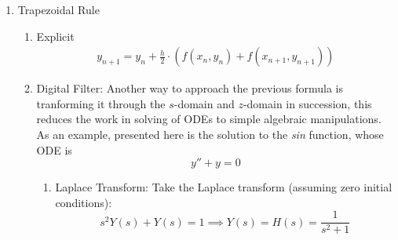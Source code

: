 \documentclass[conference]{IEEEtran}
\begin{document}
\begin{enumerate}
\begin{enumerate}
\item {Backward Euler (Implicit)}
\begin{align}
y_{n+1} = y_n + h \cdot f(x_{n+1}, y_{n+1})
\end{align}
\end{enumerate}
\item {Trapezoidal Rule}
\begin{enumerate}
	\item Explicit
\begin{align}
y_{n+1} = y_n + \frac{h}{2}\cdot(f(x_n, y_n) + f(x_{n+1}, y_{n+1}))
\end{align}
%
\item Digital Filter: Another way to approach the previous formula is tranforming it through the $s$-domain and $z$-domain in succession, this reduces the work in solving of ODEs to simple algebraic manipulations. As an example, presented here is the solution to the \textit{sin} function, whose ODE is
\begin{equation}
  y'' + y = 0
\end{equation}
\begin{enumerate}
	\item {Laplace Transform:} Take the Laplace transform (assuming zero initial conditions):
\begin{equation}
 s^2 Y(s) + Y(s) = 1 \implies Y(s) = H(s) = \frac{1}{s^2+1}

\end{equation}
\end{enumerate}
\end{enumerate}
\end{enumerate}
\end{document}
